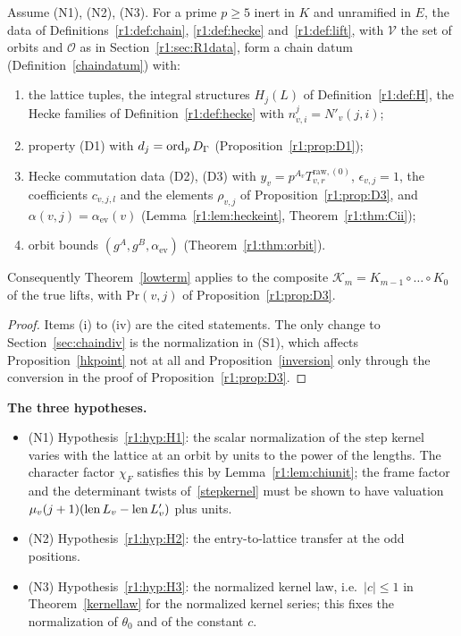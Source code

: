 \begin{theorem}\label{r1:thm:R1main}
Assume (N1), (N2), (N3). For a prime $p\ge5$ inert in $K$ and unramified in $E$, the data of Definitions~\ref{r1:def:chain}, \ref{r1:def:hecke} and~\ref{r1:def:lift}, with $\mathcal V$ the set of orbits and $\mathcal O$ as in Section~\ref{r1:sec:R1data}, form a chain datum (Definition~\ref{chaindatum}) with:
\begin{enumerate}
\item[(i)] the lattice tuples, the integral structures $H_j(L)$ of Definition~\ref{r1:def:H}, the Hecke families of Definition~\ref{r1:def:hecke} with $n^j_{v,i}=N'_v(j,i)$;
\item[(ii)] property (D1) with $d_j=\operatorname{ord}_pD_\Gamma$ (Proposition~\ref{r1:prop:D1});
\item[(iii)] Hecke commutation data (D2), (D3) with $y_v=p^{A_v}T^{\mathrm{raw},(0)}_{v,r}$, $\epsilon_{v,j}=1$, the coefficients $c_{v,j,l}$ and the elements $\rho_{v,j}$ of Proposition~\ref{r1:prop:D3}, and $\alpha(v,j)=\alpha_{\mathrm{ev}}(v)$ (Lemma~\ref{r1:lem:heckeint}, Theorem~\ref{r1:thm:Cii});
\item[(iv)] orbit bounds $(g^A,g^B,\alpha_{\mathrm{ev}})$ (Theorem~\ref{r1:thm:orbit}).
\end{enumerate}
Consequently Theorem~\ref{lowterm} applies to the composite $\mathcal K_m=K_{m-1}\circ\dots\circ K_0$ of the true lifts, with $\mathrm{Pr}(v,j)$ of Proposition~\ref{r1:prop:D3}.
\end{theorem}

\begin{proof}
Items (i) to (iv) are the cited statements. The only change to Section~\ref{sec:chaindiv} is the normalization in (S1), which affects Proposition~\ref{hkpoint} not at all and Proposition~\ref{inversion} only through the conversion in the proof of Proposition~\ref{r1:prop:D3}.
\end{proof}

\noindent\textbf{The three hypotheses.}
\begin{itemize}
\item (N1) Hypothesis~\ref{r1:hyp:H1}: the scalar normalization of the step kernel varies with the lattice at an orbit by units to the power of the lengths. The character factor $\chi_F$ satisfies this by Lemma~\ref{r1:lem:chiunit}; the frame factor and the determinant twists of~\eqref{stepkernel} must be shown to have valuation $\mu_v(j+1)(\operatorname{len} L_v-\operatorname{len} L'_v)$ plus units.
\item (N2) Hypothesis~\ref{r1:hyp:H2}: the entry-to-lattice transfer at the odd positions.
\item (N3) Hypothesis~\ref{r1:hyp:H3}: the normalized kernel law, i.e.\ $\lvert c\rvert\le1$ in Theorem~\ref{kernellaw} for the normalized kernel series; this fixes the normalization of $\theta_0$ and of the constant $c$.
\end{itemize}


